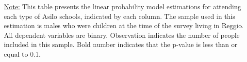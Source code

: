 \begin{footnotesize}
\noindent\underline{Note:} This table presents the linear probability model estimations for attending each type of Asilo schools, indicated by each column. The sample used in this estimation is males who were children at the time of the survey living in Reggio. All dependent variables are binary. Observation indicates the number of people included in this sample. Bold number indicates that the p-value is less than or equal to 0.1.
\end{footnotesize}
